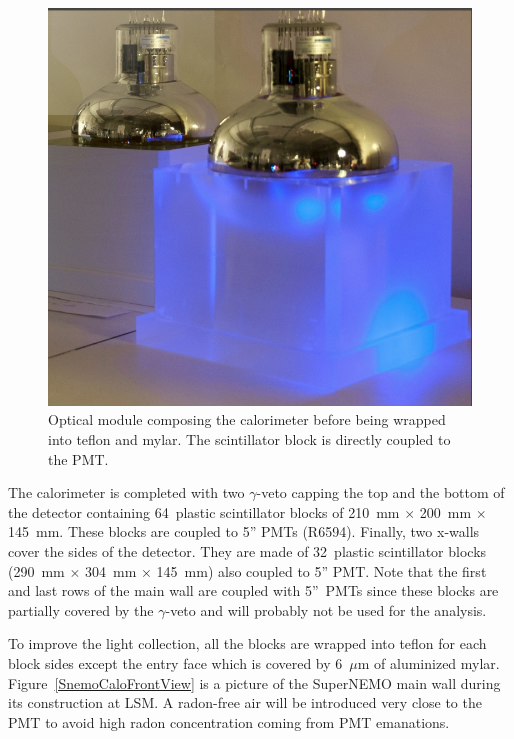 \documentclass[main.tex]{subfiles}
\begin{document}
\begin{figure}[h!]
\begin{center}
\includegraphics[scale=0.25]{pictures/Chap3/calo_1.png}
\caption{Optical module composing the calorimeter before being wrapped into teflon and mylar. The scintillator block is directly coupled to the PMT.}
\label{SnemoOpticalModule}
\end{center}
\end{figure}



\NI The calorimeter is completed with two $\gamma$-veto capping the top and the bottom of the detector containing 64~plastic scintillator blocks of 210~mm $\times$ 200~mm $\times$ 145~mm. These blocks are coupled to 5'' PMTs (R6594). Finally, two x-walls cover the sides of the detector. They are made of 32~plastic scintillator blocks (290~mm $\times$ 304~mm $\times$ 145~mm) also coupled to 5'' PMT. Note that the first and last rows of the main wall are coupled with 5''~PMTs since these blocks are partially covered by the $\gamma$-veto and will probably not be used for the analysis.

\bigskip


\NI To improve the light collection, all the blocks are wrapped into teflon for each block sides except the entry face which is covered by 6~$\mu$m of aluminized mylar. Figure~\ref{SnemoCaloFrontView} is a picture of the SuperNEMO main wall during its construction at LSM. A radon-free air will be introduced very close to the PMT to avoid high radon concentration coming from PMT emanations.
\end{document}
